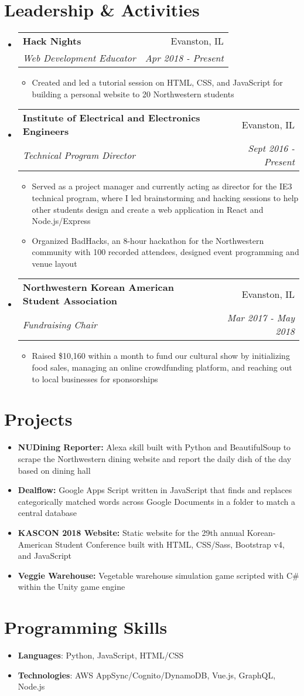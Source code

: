 \documentclass[letterpaper,11pt]{article}
\makeatletter
\newcommand{\resumeItem}[2]{
  \item\small{
    \textbf{#1}{#2 \vspace{-2pt}}
  }
}
\newcommand{\resumeSubheading}[4]{
  \vspace{-1pt}\item
    \begin{tabular*}{0.97\textwidth}{l@{\extracolsep{\fill}}r}
      \textbf{#1} & #2 \\
      \textit{\small#3} & \textit{\small #4} \\
    \end{tabular*}\vspace{-5pt}
}
\newcommand{\resumeSubItem}[2]{\resumeItem{#1}{#2}\vspace{-4pt}}
\newcommand{\resumeSubHeadingListStart}{\begin{itemize}[leftmargin=*]}
\newcommand{\resumeSubHeadingListEnd}{\end{itemize}}
\newcommand{\resumeItemListStart}{\begin{itemize}}
\newcommand{\resumeItemListEnd}{\end{itemize}\vspace{-5pt}}
\makeatother
\begin{document}
\section{Leadership \& Activities}
  \resumeSubHeadingListStart
    \resumeSubheading
      {Hack Nights}{Evanston, IL}
      {Web Development Educator}{Apr 2018 - Present}
      \resumeItemListStart
        \resumeItem{}
          {Created and led a tutorial session on HTML, CSS, and JavaScript for building a personal website to 20 Northwestern students}
      \resumeItemListEnd
    \resumeSubheading
      {Institute of Electrical and Electronics Engineers}{Evanston, IL}
      {Technical Program Director}{Sept 2016 - Present}
      \resumeItemListStart
        \resumeItem{}
          {Served as a project manager and currently acting as director for the IE3 technical program, where I led brainstorming and hacking sessions to help other students design and create a web application in React and Node.js/Express}
        \resumeItem{}
          {Organized BadHacks, an 8-hour hackathon for the Northwestern community with 100 recorded attendees, designed event programming and venue layout}      
      \resumeItemListEnd
      \resumeSubheading
        {Northwestern Korean American Student Association}{Evanston, IL}
        {Fundraising Chair}{Mar 2017 - May 2018}
        \resumeItemListStart
          \resumeItem{}
            {Raised \$10,160 within a month to fund our cultural show by initializing food sales, managing an online crowdfunding platform, and reaching out to local businesses for sponsorships}          
      \resumeItemListEnd
    \resumeSubHeadingListEnd

\section{Projects}
  \resumeSubHeadingListStart
    \resumeSubItem{NUDining Reporter: }
      {Alexa skill built with Python and BeautifulSoup to scrape the Northwestern dining website and report the daily dish of the day based on dining hall}
    \resumeSubItem{Dealflow: }
      {Google Apps Script written in JavaScript that finds and replaces categorically matched words across Google Documents in a folder to match a central database}
    \resumeSubItem{KASCON 2018 Website: }
      {Static website for the 29th annual Korean-American Student Conference built with HTML, CSS/Sass, Bootstrap v4, and JavaScript}
    \resumeSubItem{Veggie Warehouse: }
      {Vegetable warehouse simulation game scripted with C\# within the Unity game engine}
  \resumeSubHeadingListEnd

%
\section{Programming Skills}
 \resumeSubHeadingListStart
   \item{
     \textbf{Languages}{: Python, JavaScript, HTML/CSS}
   }
   \item{
    \textbf{Technologies}{: AWS AppSync/Cognito/DynamoDB, Vue.js, GraphQL, Node.js}

   }
 \resumeSubHeadingListEnd


\end{document}
